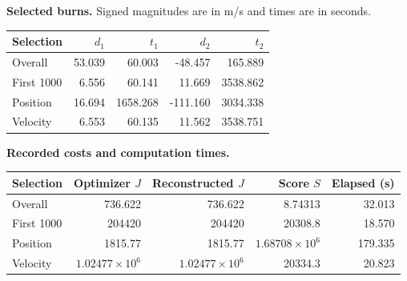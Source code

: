 \par\noindent\textbf{Selected burns.} Signed magnitudes are in m/s and times are in seconds.
\begin{center}
\begin{tabular}{lrrrr}
\toprule
Selection & $d_1$ & $t_1$ & $d_2$ & $t_2$\\
\midrule
Overall & 53.039 & 60.003 & -48.457 & 165.889\\
First 1000 & 6.556 & 60.141 & 11.669 & 3538.862\\
Position & 16.694 & 1658.268 & -111.160 & 3034.338\\
Velocity & 6.553 & 60.135 & 11.562 & 3538.751\\
\bottomrule
\end{tabular}
\end{center}
\par\noindent\textbf{Recorded costs and computation times.}
\begin{center}
\begin{tabular}{lrrrr}
\toprule
Selection & Optimizer $J$ & Reconstructed $J$ & Score $S$ & Elapsed (s)\\
\midrule
Overall & 736.622 & 736.622 & 8.74313 & 32.013\\
First 1000 & 204420 & 204420 & 20308.8 & 18.570\\
Position & 1815.77 & 1815.77 & $1.68708\times10^{6}$ & 179.335\\
Velocity & $1.02477\times10^{6}$ & $1.02477\times10^{6}$ & 20334.3 & 20.823\\
\bottomrule
\end{tabular}
\end{center}
\clearpage

